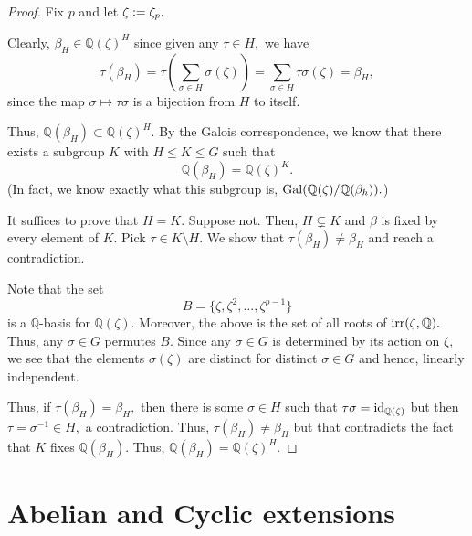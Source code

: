 \fixedfieldcyclosubgroup*\label{prop:fixedfieldcyclosubgroup2}
\begin{flushright}\hyperref[prop:fixedfieldcyclosubgroup]{\upsym}\end{flushright}
\begin{proof}
    Fix $p$ and let $\zeta \vcentcolon= \zeta_p.$

    Clearly, $\beta_H \in \mathbb{Q}(\zeta)^H$ since given any $\tau \in H,$ we have
    \begin{equation*} 
        \tau(\beta_H) = \tau\left(\sum_{\sigma \in H} \sigma(\zeta)\right) = \sum_{\sigma \in H} \tau\sigma(\zeta) = \beta_H,
    \end{equation*}
    since the map $\sigma \mapsto \tau\sigma$ is a bijection from $H$ to itself.

    Thus, $\mathbb{Q}(\beta_H) \subset \mathbb{Q}(\zeta)^H.$ By the Galois correspondence, we know that there exists a subgroup $K$ with $H \le K \le G$ such that
    \begin{equation*} 
        \mathbb{Q}(\beta_H) = \mathbb{Q}(\zeta)^K.
    \end{equation*}
    (In fact, we know exactly what this subgroup is, $\operatorname{Gal}(\mathbb{Q}(\zeta)/\mathbb{Q}(\beta_h)).$)

    It suffices to prove that $H = K.$ Suppose not. Then, $H \subsetneq K$ and $\beta$ is fixed by every element of $K.$ Pick $\tau \in K \setminus H.$ We show that $\tau(\beta_H) \neq \beta_H$ and reach a contradiction. 

    Note that the set
    \begin{equation*} 
        B = \{\zeta, \zeta^2, \ldots, \zeta^{p - 1}\}
    \end{equation*}
    is a $\mathbb{Q}$-basis for $\mathbb{Q}(\zeta).$ Moreover, the above is the set of all roots of $\operatorname{irr}(\zeta, \mathbb{Q}).$ Thus, any $\sigma \in G$ permutes $B.$ Since any $\sigma \in G$ is determined by its action on $\zeta,$ we see that the elements $\sigma(\zeta)$ are distinct for distinct $\sigma \in G$ and hence, linearly independent.

    Thus, if $\tau(\beta_H) = \beta_H,$ then there is some $\sigma \in H$ such that $\tau\sigma = \operatorname{id}_{\mathbb{Q}(\zeta)}$ but then $\tau = \sigma^{-1} \in H,$ a contradiction. Thus, $\tau(\beta_H) \neq \beta_H$ but that contradicts the fact that $K$ fixes $\mathbb{Q}(\beta_H).$ Thus, $\mathbb{Q}(\beta_H) = \mathbb{Q}(\zeta)^H.$
\end{proof}

\section{Abelian and Cyclic extensions}


